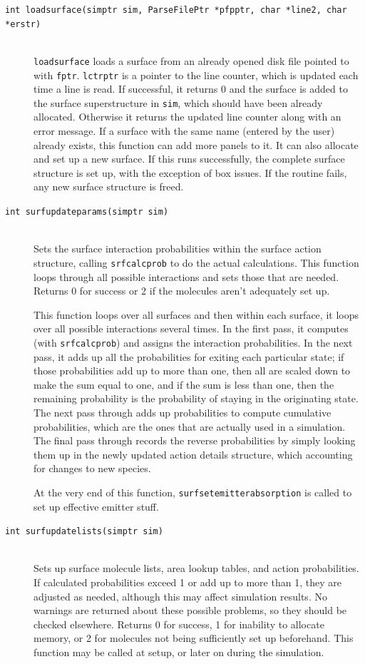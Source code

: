 \documentclass {scrbook}
\newcommand {\ttt} {\texttt}
\begin{document}
\begin{description}
\item[\ttt{int loadsurface(simptr sim, ParseFilePtr *pfpptr, char *line2, char *erstr)}]
\hfill \\
\ttt{loadsurface} loads a surface from an already opened disk file pointed to with \ttt{fptr}. \ttt{lctrptr} is a pointer to the line counter, which is updated each time a line is read. If successful, it returns 0 and the surface is added to the surface superstructure in \ttt{sim}, which should have been already allocated. Otherwise it returns the updated line counter along with an error message. If a surface with the same name (entered by the user) already exists, this function can add more panels to it. It can also allocate and set up a new surface. If this runs successfully, the complete surface structure is set up, with the exception of box issues. If the routine fails, any new surface structure is freed.

\item[\ttt{int surfupdateparams(simptr sim)}]
\hfill \\
Sets the surface interaction probabilities within the surface action structure, calling \ttt{srfcalcprob} to do the actual calculations. This function loops through all possible interactions and sets those that are needed. Returns 0 for success or 2 if the molecules aren't adequately set up.

This function loops over all surfaces and then within each surface, it loops over all possible interactions several times. In the first pass, it computes (with \ttt{srfcalcprob}) and assigns the interaction probabilities. In the next pass, it adds up all the probabilities for exiting each particular state; if those probabilities add up to more than one, then all are scaled down to make the sum equal to one, and if the sum is less than one, then the remaining probability is the probability of staying in the originating state. The next pass through adds up probabilities to compute cumulative probabilities, which are the ones that are actually used in a simulation. The final pass through records the reverse probabilities by simply looking them up in the newly updated action details structure, which accounting for changes to new species.

At the very end of this function, \ttt{surfsetemitterabsorption} is called to set up effective emitter stuff.

\item[\ttt{int surfupdatelists(simptr sim)}]
\hfill \\
Sets up surface molecule lists, area lookup tables, and action probabilities. If calculated probabilities exceed 1 or add up to more than 1, they are adjusted as needed, although this may affect simulation results. No warnings are returned about these possible problems, so they should be checked elsewhere. Returns 0 for success, 1 for inability to allocate memory, or 2 for molecules not being sufficiently set up beforehand. This function may be called at setup, or later on during the simulation.


\end{description}
\end{document}
